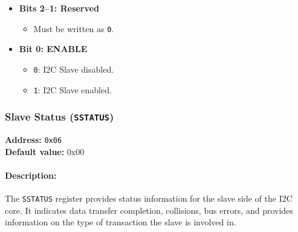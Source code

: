 \begin{itemize}[leftmargin=*,itemsep=2mm]
  \item \textbf{Bits 2--1: Reserved}  
        \begin{itemize}
          \item Must be written as \texttt{0}.
        \end{itemize}
  \item \textbf{Bit 0: ENABLE}  
        \begin{itemize}
          \item \texttt{0}: I2C Slave disabled.
          \item \texttt{1}: I2C Slave enabled.
        \end{itemize}
\end{itemize}

\vspace{2mm}

\subsubsection{Slave Status (\texttt{SSTATUS})}
\label{sec:sstatus}

\textbf{Address:} \texttt{0x06} \\
\textbf{Default value:} 0x00

\paragraph{Description:}  
The \texttt{SSTATUS} register provides status information for the slave side of the I2C core. It indicates data transfer
completion, collisions, bus errors, and provides information on the type of transaction the slave is involved in.

